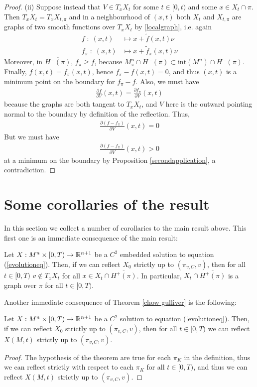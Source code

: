 \begin{proof}
	(ii) Suppose instead that $V\in T_xX_t$  for some $t\in [0, t)$ and some $x\in X_t\cap \pi$. Then $T_xX_t= T_xX_{t, \pi}$ and in a neighbourhood of $(x, t)$ both $X_t$ and $X_{t, \pi}$ are graphs of two smooth functions over $T_xX_t$ by \ref{localgraph}, i.e. again
	\begin{align*}
		f \; : \; (x, t) &\mapsto x+\tilde{f}(x, t)\nu \\
		f_\pi \; : \; (x, t) &\mapsto x+\tilde{f}_\pi(x, t)\nu 
	\end{align*} 
	Moreover, in $\overline{H^-(\pi)}$, $f_\pi\geq f$, because $M^n_\pi\cap H^-(\pi)\subset \mathrm{int}(M^n)\cap H^-(\pi)$. Finally, $f(x, t)=f_\pi (x, t)$, hence $f_\pi-f (x, t)=0$, and thus  $(x, t)$ is a minimum point on the boundary for $f_\pi-f$. Also, we must have
	\begin{align*}
		\frac{\partial f}{\partial V}(x,t)=\frac{\partial f_\pi}{\partial V}(x,t)
	\end{align*}
	because the graphs are both tangent to $T_xX_t$, and $V$ here is the outward pointing normal to the boundary by definition of the reflection. Thus, 
	\begin{align*}
		\frac{\partial (f- f_\pi)}{\partial V}(x,t)=0
	\end{align*}
	But we must have 
	\begin{align*}
		\frac{\partial (f- f_\pi)}{\partial V}(x,t)>0
	\end{align*}
	at a minimum on the boundary by Proposition \ref{secondapplication}, a contradiction.  
\end{proof}


\section{Some corollaries of the result} 
In this section we collect a number of corollaries to the main result above. This first one is an immediate consequence of the main result:
\begin{cor}
	Let $X:M^n\times [0,T) \rightarrow \mathbb{R}^{n+1}$ be a $C^2$ embedded solution to equation (\ref{evolutioneq}). Then, if we can reflect $X_0$ strictly up to $(\pi_{v,C},v)$, then for all $t\in [0,T)$ $v\notin T_xX_t$ for all $x\in X_t\cap\overline{H^+(\pi)}$. In particular,  $ X_t\cap\overline{H^+(\pi)}$ is a graph over $\pi$ for all $t\in [0,T)$.\label{graph}
\end{cor}




Another immediate consequence of Theorem \ref{chow gulliver} is the following:
\begin{cor}
	Let $X:M^n\times [0,T) \rightarrow \mathbb{R}^{n+1}$ be a $C^2$ solution to equation (\ref{evolutioneq}). Then, if we can reflect $X_0$ strictly up to $(\pi_{v,C},v)$, then for all $t\in [0,T)$ we can reflect $X(M, t)$ strictly up to $(\pi_{v,C},v)$.  
\end{cor}
\begin{proof}
	The hypothesis of the theorem are true for each $\pi_K$ in the definition, thus we can reflect strictly with respect to each $\pi_K$ for all $t\in[0,T)$, and thus we can reflect $X(M, t)$ strictly up to $(\pi_{v,C},v)$.
\end{proof}

